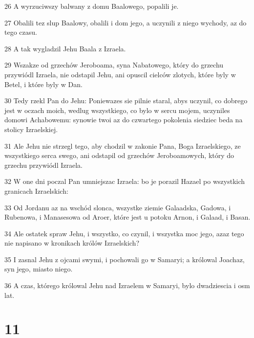 \par 26 A wyrzuciwszy balwany z domu Baalowego, popalili je.
\par 27 Obalili tez slup Baalowy, obalili i dom jego, a uczynili z niego wychody, az do tego czasu.
\par 28 A tak wygladzil Jehu Baala z Izraela.
\par 29 Wszakze od grzechów Jeroboama, syna Nabatowego, który do grzechu przywiódl Izraela, nie odstapil Jehu, ani opuscil cielców zlotych, które byly w Betel, i które byly w Dan.
\par 30 Tedy rzekl Pan do Jehu: Poniewazes sie pilnie staral, abys uczynil, co dobrego jest w oczach moich, wedlug wszystkiego, co bylo w sercu mojem, uczyniles domowi Achabowemu: synowie twoi az do czwartego pokolenia siedziec beda na stolicy Izraelskiej.
\par 31 Ale Jehu nie strzegl tego, aby chodzil w zakonie Pana, Boga Izraelskiego, ze wszystkiego serca swego, ani odstapil od grzechów Jeroboamowych, który do grzechu przywiódl Izraela.
\par 32 W one dni poczal Pan umniejszac Izraela: bo je porazil Hazael po wszystkich granicach Izraelskich:
\par 33 Od Jordanu az na wschód slonca, wszystke ziemie Galaadska, Gadowa, i Rubenowa, i Manasesowa od Aroer, które jest u potoku Arnon, i Galaad, i Basan.
\par 34 Ale ostatek spraw Jehu, i wszystko, co czynil, i wszystka moc jego, azaz tego nie napisano w kronikach królów Izraelskich?
\par 35 I zasnal Jehu z ojcami swymi, i pochowali go w Samaryi; a królowal Joachaz, syn jego, miasto niego.
\par 36 A czas, którego królowal Jehu nad Izraelem w Samaryi, bylo dwadziescia i osm lat.

\chapter{11}

